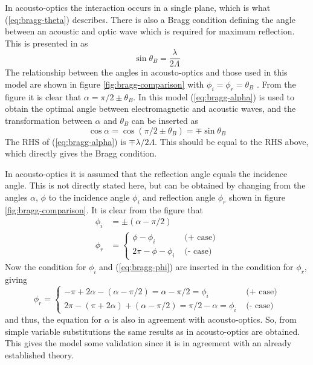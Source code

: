 \documentclass[10pt,a4paper]{eitExjobb}
\begin{document}
	In acousto-optics the interaction occurs in a single plane, which is what (\ref{eq:bragg-theta}) describes. There is also a Bragg condition defining the angle between an acoustic and optic wave which is required for maximum reflection. This is presented in \cite{Saleh2007} as
	\begin{equation*}
	\sin{\theta_B} = \frac{\lambda}{2\Lambda}
	\end{equation*}
	The relationship between the angles in acousto-optics and those used in this model are shown in figure \ref{fig:bragg-comparison} with $\phi_i = \phi_r = \theta_B$ \cite{Saleh2007}. From the figure it is clear that $\alpha = \pi/2 \pm \theta_B$. In this model (\ref{eq:bragg-alpha}) is used to obtain the optimal angle between electromagnetic and acoustic waves, and the transformation between $\alpha$ and $\theta_B$ can be inserted as
	\begin{equation*}
	\cos{\alpha} = \cos(\pi/2 \pm \theta_B) = \mp \sin{\theta_B}
	\end{equation*}
	The RHS of (\ref{eq:bragg-alpha}) is $\mp \lambda/2\Lambda$. This should be equal to the RHS above, which directly gives the Bragg condition.
	
	In acousto-optics it is assumed that the reflection angle equals the incidence angle. This is not directly stated here, but can be obtained by changing from the angles $\alpha$, $\phi$ to the incidence angle $\phi_i$ and reflection angle $\phi_r$ shown in figure \ref{fig:bragg-comparison}. It is clear from the figure that
	\begin{align*}
		\phi_i &= \pm(\alpha - \pi/2) \\
		\phi_r &=
		\begin{cases}
			\phi - \phi_i &\text{ (+ case)} \\
			2\pi - \phi - \phi_i &\text{ (- case)}
		\end{cases}
	\end{align*}
	Now the condition for $\phi_i$ and (\ref{eq:bragg-phi}) are inserted in the condition for $\phi_r$, giving
	\begin{equation*}
		\phi_r =
		\begin{cases}
			-\pi + 2\alpha - (\alpha - \pi/2) = \alpha - \pi/2 = \phi_i &\text{ (+ case)}\\
			2\pi - (\pi + 2\alpha) + (\alpha - \pi/2) = \pi/2 - \alpha = \phi_i &\text{ (- case)}
		\end{cases}
	\end{equation*}
	and thus, the equation for $\alpha$ is also in agreement with acousto-optics. So, from simple variable substitutions the same results as in acousto-optics are obtained. This gives the model some validation since it is in agreement with an already established theory.
	
\end{document}
